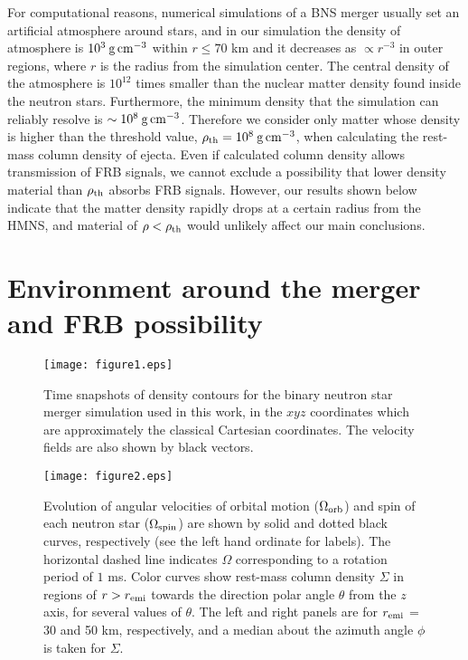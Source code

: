 \documentclass[]{pasj01}
\begin{document}
For computational reasons, numerical simulations of a BNS merger
usually set an artificial atmosphere around stars, and in our
simulation the density of atmosphere is $10^3\:\rm{g\,cm^{-3}}$ within
$r \le 70$ km and it decreases as $\propto r^{-3}$ in outer regions,
where $r$ is the radius from the simulation center. The central
density of the atmosphere is $10^{12}$ times smaller than the nuclear
matter density found inside the neutron stars. Furthermore, the
minimum density that the simulation can reliably resolve is $\sim
10^8\:\rm{g\,cm^{-3}}$. Therefore we consider only matter whose
density is higher than the threshold value, $\rho_{\rm th}=
10^8\:\rm{g\,cm^{-3}}$, when calculating the rest-mass column density
of ejecta.  Even if calculated column density allows transmission of
FRB signals, we cannot exclude a possibility that lower density
material than $\rho_{\rm th}$ absorbs FRB signals.  However, our
results shown below indicate that the matter density rapidly drops at
a certain radius from the HMNS, and material of $\rho < \rho_{\rm th}$
would unlikely affect our main conclusions.


\section{Environment around the merger and FRB possibility}
\label{sec: Result}

\begin{figure*}
 \texttt{[image: figure1.eps]}
 \caption{Time snapshots of density contours for the binary neutron
   star merger simulation used in this work, in the $xyz$ coordinates
   which are approximately the classical Cartesian coordinates.  The
   velocity fields are also shown by black vectors.
}
 \label{fig: snapshots}
\end{figure*}

\begin{figure*}
 \texttt{[image: figure2.eps]}
 \caption{Evolution of angular velocities of orbital motion
   ($\Omega_{\rm orb}$) and spin of each neutron star ($\Omega_{\rm
     spin}$) are shown by solid and dotted black curves, respectively
   (see the left hand ordinate for labels).  The horizontal dashed
   line indicates $\Omega$ corresponding to a rotation period of $1$
   ms. Color curves show rest-mass column density $\Sigma$ in regions
   of $r > r_{\rm emi}$ towards the direction polar angle $\theta$
   from the $z$ axis, for several values of $\theta$. The left and
   right panels are for $r_{\rm emi}$ = 30 and 50 km, respectively,
   and a median about the azimuth angle $\phi$ is taken for
   $\Sigma$. }
 \label{fig: evolution of spin rate & column density}
\end{figure*}
\end{document}
